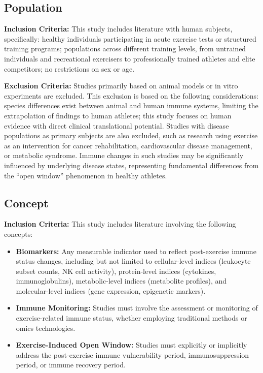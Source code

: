 \documentclass[12pt,a4paper]{article}
\newcommand{\openwindow}{``open window''}
\begin{document}
\subsection{Population}

\textbf{Inclusion Criteria:}
This study includes literature with human subjects, specifically: healthy individuals participating in acute exercise tests or structured training programs; populations across different training levels, from untrained individuals and recreational exercisers to professionally trained athletes and elite competitors; no restrictions on sex or age.

\textbf{Exclusion Criteria:}
Studies primarily based on animal models or in vitro experiments are excluded. This exclusion is based on the following considerations: species differences exist between animal and human immune systems, limiting the extrapolation of findings to human athletes; this study focuses on human evidence with direct clinical translational potential. Studies with disease populations as primary subjects are also excluded, such as research using exercise as an intervention for cancer rehabilitation, cardiovascular disease management, or metabolic syndrome. Immune changes in such studies may be significantly influenced by underlying disease states, representing fundamental differences from the \openwindow{} phenomenon in healthy athletes.

\subsection{Concept}

\textbf{Inclusion Criteria:}
This study includes literature involving the following concepts:

\begin{itemize}
\item \textbf{Biomarkers:} Any measurable indicator used to reflect post-exercise immune status changes, including but not limited to cellular-level indices (leukocyte subset counts, NK cell activity), protein-level indices (cytokines, immunoglobulins), metabolic-level indices (metabolite profiles), and molecular-level indices (gene expression, epigenetic markers).

\item \textbf{Immune Monitoring:} Studies must involve the assessment or monitoring of exercise-related immune status, whether employing traditional methods or omics technologies.

\item \textbf{Exercise-Induced Open Window:} Studies must explicitly or implicitly address the post-exercise immune vulnerability period, immunosuppression period, or immune recovery period.
\end{itemize}
\end{document}
